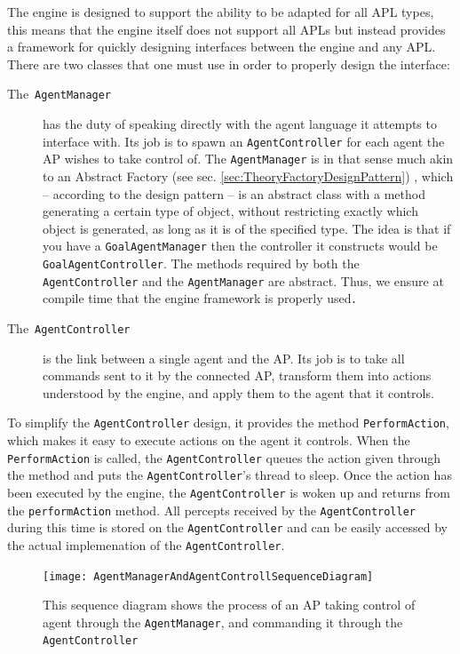The engine is designed to support the ability to be adapted for all
APL types, this means that the engine itself does not support all
APLs but instead provides a framework for quickly designing interfaces
between the engine and any APL. There are two classes that one must
use in order to properly design the interface:
\begin{description}
\item [{The~\texttt{AgentManager}}] has the duty of speaking directly
with the agent language it attempts to interface with. Its job is
to spawn an \texttt{AgentController} for each agent the AP wishes
to take control of. The \texttt{AgentManager} is in that sense much
akin to an Abstract Factory (see sec. \ref{sec:TheoryFactoryDesignPattern})
, which -- according to the design pattern -- is an abstract class
with a method generating a certain type of object, without restricting
exactly which object is generated, as long as it is of the specified
type. The idea is that if you have a \texttt{GoalAgentManager} then
the controller it constructs would be \texttt{GoalAgentController}.
The methods required by both the \texttt{AgentController} and the
\texttt{AgentManager} are abstract. Thus, we ensure at compile time
that the engine framework is properly used\texttt{\emph{.}}
\item [{The~\texttt{AgentController}}] is the link between a single agent
and the AP. Its job is to take all commands sent to it by the connected
AP, transform them into actions understood by the engine, and apply
them to the agent that it controls.
\end{description}
To simplify the \texttt{AgentController} design, it provides the method
\texttt{PerformAction}, which makes it easy to execute actions on
the agent it controls. When the \texttt{PerformAction} is called,
the \texttt{AgentController} queues the action given through the method
and puts the \texttt{AgentController}\textquoteright{}s thread to
sleep. Once the action has been executed by the engine, the \texttt{AgentController}
is woken up and returns from the \texttt{performAction} method. All
percepts received by the \texttt{AgentController} during this time
is stored on the \texttt{AgentController} and can be easily accessed
by the actual implemenation of the \texttt{AgentController}.

\begin{figure}
\begin{centering}
\texttt{[image: AgentManagerAndAgentControllSequenceDiagram]}
\par\end{centering}

\caption{This sequence diagram shows the process of an AP taking control of
agent through the \texttt{AgentManager}, and commanding it through
the \texttt{AgentController\label{fig:APConnectingToAndControllingAC}}}
\end{figure}


